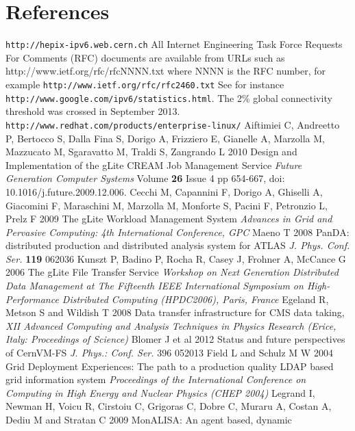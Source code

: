 \section*{References}

\begin{thebibliography}{1}
 {\tt http://hepix-ipv6.web.cern.ch}
 All Internet Engineering Task Force Requests For Comments (RFC) documents are available
from URLs such as http://www.ietf.org/rfc/rfcNNNN.txt where NNNN is the RFC number, for example {\tt http://www.ietf.org/rfc/rfc2460.txt}
 See for instance {\tt http://www.google.com/ipv6/statistics.html}. The 2\% global connectivity threshold was crossed in September 2013.
 {\tt http://www.redhat.com/products/enterprise-linux/}
Aiftimiei C, Andreetto P, Bertocco S, Dalla Fina S, Dorigo A,
Frizziero E, Gianelle A, Marzolla M, Mazzucato M, Sgaravatto M,
Traldi S, Zangrando L 2010 Design and Implementation of the gLite CREAM Job
Management Service {\it Future Generation Computer Systems} Volume {\bf 26} Issue
4 pp 654-667, doi: 10.1016/j.future.2009.12.006.
Cecchi M, Capannini F, Dorigo A, Ghiselli A, Giacomini F, Maraschini M, Marzolla M, Monforte S, Pacini F, Petronzio L, Prelz F 2009 The gLite Workload Management System {\it Advances in Grid and Pervasive Computing: 4th International Conference, GPC}
Maeno T 2008 PanDA: distributed production and distributed analysis
system for ATLAS {\it J. Phys. Conf. Ser.} {\bf 119} 062036
Kunszt P, Badino P, Rocha R, Casey J, Frohner A, McCance G 2006 The gLite File Transfer Service
{\it Workshop on Next Generation Distributed Data Management at The Fifteenth IEEE International Symposium on High-Performance Distributed Computing (HPDC2006), Paris, France}
Egeland R, Metson S and  Wildish T 2008 Data transfer infrastructure for
CMS data taking,  {\it XII Advanced Computing and Analysis Techniques in
Physics Research (Erice, Italy: Proceedings of Science)}
Blomer J et al 2012 Status and future perspectives of CernVM-FS
{\it J. Phys.: Conf. Ser.} {\bf}396 052013
Field L and Schulz M W 2004  Grid Deployment Experiences: The path to a production quality LDAP based grid information system {\it Proceedings of the International Conference on Computing in High Energy and Nuclear Physics (CHEP 2004)}
Legrand I, Newman H, Voicu R, Cirstoiu C, Grigoras C, Dobre C, Muraru A,
Costan A, Dediu M and Stratan C 2009 MonALISA: An agent based, dynamic

\end{thebibliography}
